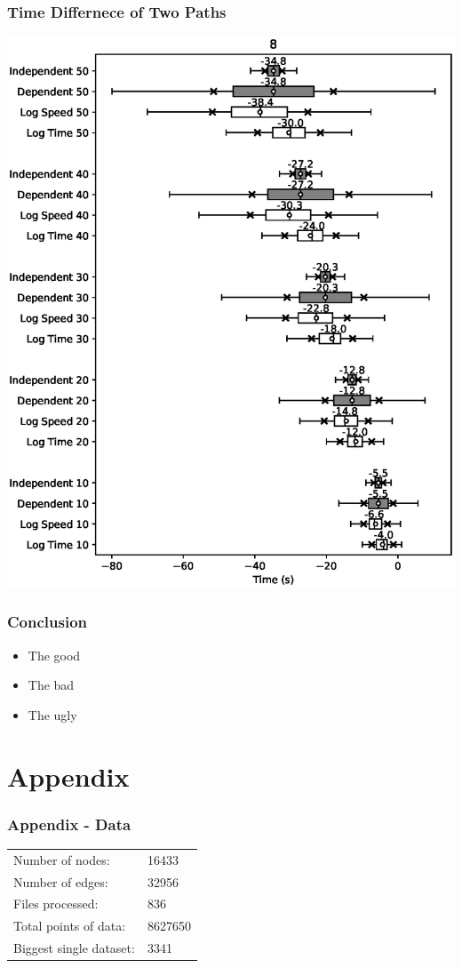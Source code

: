 \documentclass{beamer}
\begin{document}
	\begin{frame}
		\frametitle{Time Differnece of Two Paths}
		\hspace{1.6cm}\includegraphics[height=0.8\textheight]{8.eps}
	\end{frame}

	\begin{frame}
		\frametitle{Conclusion}
		\LARGE
		\begin{itemize}
			\item The good
			\item The bad
			\item The ugly
		\end{itemize}
	\end{frame}

	\section{Appendix}

	\begin{frame}
		\frametitle{Appendix - Data}
			\begin{tabular}{ll}
				Number of nodes: & 16433\\
				Number of edges: & 32956\\
				Files processed: & 836 \\
				Total points of data: & 8627650\\
				Biggest single dataset: & 3341\\
			\end{tabular}
	\end{frame}
\end{document}
